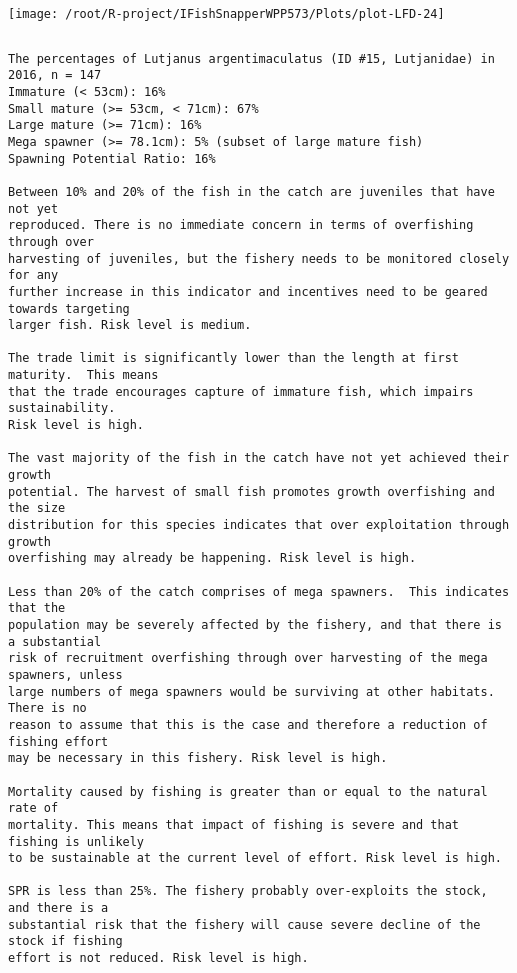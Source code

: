 \documentclass{report}\usepackage[]{graphicx}\usepackage[]{color}
\makeatletter
\def\maxwidth{ %
  \ifdim\Gin@nat@width>\linewidth
    \linewidth
  \else
    \Gin@nat@width
  \fi
}
\newenvironment{kframe}{%
 \def\at@end@of@kframe{}%
 \ifinner\ifhmode%
  \def\at@end@of@kframe{\end{minipage}}%
  \begin{minipage}{\columnwidth}%
 \fi\fi%
 \def\FrameCommand##1{\hskip\@totalleftmargin \hskip-\fboxsep
 \colorbox{shadecolor}{##1}\hskip-\fboxsep
     \hskip-\linewidth \hskip-\@totalleftmargin \hskip\columnwidth}%
 \MakeFramed {\advance\hsize-\width
   \@totalleftmargin\z@ \linewidth\hsize
   \@setminipage}}%
 {\par\unskip\endMakeFramed%
 \at@end@of@kframe}
\newenvironment{knitrout}{}{} %
\makeatother
\begin{document}
\begin{knitrout}
\texttt{[image: /root/R-project/IFishSnapperWPP573/Plots/plot-LFD-24]} 
\begin{kframe}\begin{verbatim}
\end{verbatim}
\end{kframe}
\clearpage
\newpage
\begin{kframe}\begin{verbatim}The percentages of Lutjanus argentimaculatus (ID #15, Lutjanidae) in 2016, n = 147
Immature (< 53cm): 16%
Small mature (>= 53cm, < 71cm): 67%
Large mature (>= 71cm): 16%
Mega spawner (>= 78.1cm): 5% (subset of large mature fish)
Spawning Potential Ratio: 16%
 
Between 10% and 20% of the fish in the catch are juveniles that have not yet
reproduced. There is no immediate concern in terms of overfishing through over
harvesting of juveniles, but the fishery needs to be monitored closely for any
further increase in this indicator and incentives need to be geared towards targeting
larger fish. Risk level is medium.

The trade limit is significantly lower than the length at first maturity.  This means
that the trade encourages capture of immature fish, which impairs sustainability.
Risk level is high.

The vast majority of the fish in the catch have not yet achieved their growth
potential. The harvest of small fish promotes growth overfishing and the size
distribution for this species indicates that over exploitation through growth
overfishing may already be happening. Risk level is high.

Less than 20% of the catch comprises of mega spawners.  This indicates that the
population may be severely affected by the fishery, and that there is a substantial
risk of recruitment overfishing through over harvesting of the mega spawners, unless
large numbers of mega spawners would be surviving at other habitats. There is no
reason to assume that this is the case and therefore a reduction of fishing effort
may be necessary in this fishery. Risk level is high.
 
Mortality caused by fishing is greater than or equal to the natural rate of
mortality. This means that impact of fishing is severe and that fishing is unlikely
to be sustainable at the current level of effort. Risk level is high.
 
SPR is less than 25%. The fishery probably over-exploits the stock, and there is a
substantial risk that the fishery will cause severe decline of the stock if fishing
effort is not reduced. Risk level is high.
 

\end{verbatim}
\end{kframe}
\end{knitrout}
\end{document}
